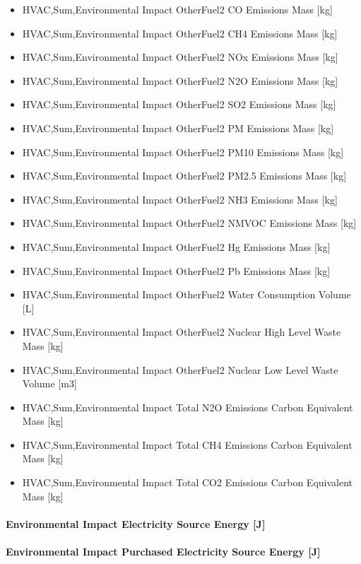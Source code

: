 \begin{itemize}
\item
  HVAC,Sum,Environmental Impact OtherFuel2 CO Emissions Mass {[}kg{]}
\item
  HVAC,Sum,Environmental Impact OtherFuel2 CH4 Emissions Mass {[}kg{]}
\item
  HVAC,Sum,Environmental Impact OtherFuel2 NOx Emissions Mass {[}kg{]}
\item
  HVAC,Sum,Environmental Impact OtherFuel2 N2O Emissions Mass {[}kg{]}
\item
  HVAC,Sum,Environmental Impact OtherFuel2 SO2 Emissions Mass {[}kg{]}
\item
  HVAC,Sum,Environmental Impact OtherFuel2 PM Emissions Mass {[}kg{]}
\item
  HVAC,Sum,Environmental Impact OtherFuel2 PM10 Emissions Mass {[}kg{]}
\item
  HVAC,Sum,Environmental Impact OtherFuel2 PM2.5 Emissions Mass {[}kg{]}
\item
  HVAC,Sum,Environmental Impact OtherFuel2 NH3 Emissions Mass {[}kg{]}
\item
  HVAC,Sum,Environmental Impact OtherFuel2 NMVOC Emissions Mass {[}kg{]}
\item
  HVAC,Sum,Environmental Impact OtherFuel2 Hg Emissions Mass {[}kg{]}
\item
  HVAC,Sum,Environmental Impact OtherFuel2 Pb Emissions Mass {[}kg{]}
\item
  HVAC,Sum,Environmental Impact OtherFuel2 Water Consumption Volume {[}L{]}
\item
  HVAC,Sum,Environmental Impact OtherFuel2 Nuclear High Level Waste Mass {[}kg{]}
\item
  HVAC,Sum,Environmental Impact OtherFuel2 Nuclear Low Level Waste Volume {[}m3{]}
\item
  HVAC,Sum,Environmental Impact Total N2O Emissions Carbon Equivalent Mass {[}kg{]}
\item
  HVAC,Sum,Environmental Impact Total CH4 Emissions Carbon Equivalent Mass {[}kg{]}
\item
  HVAC,Sum,Environmental Impact Total CO2 Emissions Carbon Equivalent Mass {[}kg{]}
\end{itemize}

\paragraph{Environmental Impact Electricity Source Energy {[}J{]}}\label{environmental-impact-electricity-source-energy-j}

\paragraph{Environmental Impact Purchased Electricity Source Energy {[}J{]}}\label{environmental-impact-purchased-electricity-source-energy-j}

